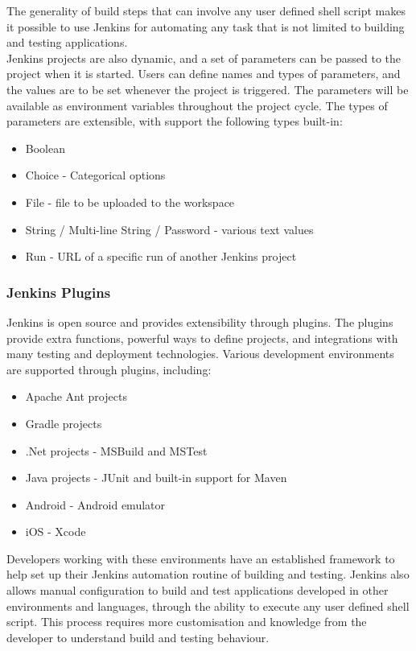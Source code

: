 The generality of build steps that can involve any user defined shell script makes it possible to use Jenkins for automating any task that is not limited to building and testing applications.\\
Jenkins projects are also dynamic, and a set of parameters can be passed to the project when it is started. Users can define names and types of parameters, and the values are to be set whenever the project is triggered. The parameters will be available as environment variables throughout the project cycle. The types of parameters are extensible, with support the following types built-in: \cite{pbuild}
\begin{itemize}
\item Boolean
\item Choice - Categorical options
\item File - file to be uploaded to the workspace
\item String / Multi-line String / Password - various text values
\item Run - URL of a specific run of another Jenkins project
\end{itemize}


\subsubsection{Jenkins Plugins}
Jenkins is open source and provides extensibility through plugins. The plugins provide extra functions, powerful ways to define projects, and integrations with many testing and deployment technologies.
Various development environments are supported through plugins, including: \cite{jenplug}
\begin{itemize}
\item Apache Ant projects
\item Gradle projects
\item .Net projects - MSBuild and MSTest
\item Java projects - JUnit and built-in support for Maven
\item Android - Android emulator
\item iOS - Xcode
\end{itemize}
Developers working with these environments have an established framework to help set up their Jenkins automation routine of building and testing. Jenkins also allows manual configuration to build and test applications developed in other environments and languages, through the ability to execute any user defined shell script. This process requires more customisation and knowledge from the developer to understand build and testing behaviour.

